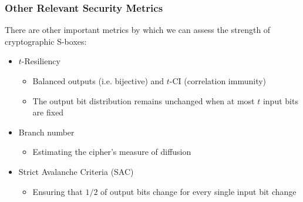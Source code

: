 \documentclass[10pt]{beamer}
\begin{document}





\begin{frame}
	\frametitle{Other Relevant Security Metrics}
	There are other important metrics by which we can assess the strength of cryptographic S-boxes:
	\begin{itemize}
		\item $t$-Resiliency
		\begin{itemize}
			\item Balanced outputs (i.e. bijective) and $t$-CI (correlation immunity)
			\item The output bit distribution remains unchanged when at most $t$ input bits are fixed
		\end{itemize}
		\item Branch number
		\begin{itemize}
			\item Estimating the cipher's measure of diffusion
		\end{itemize}
		\item Strict Avalanche Criteria (SAC) 
		\begin{itemize}
			\item Ensuring that $1/2$ of output bits change for every single input bit change
		\end{itemize}
	\end{itemize}
\end{frame}
\end{document}
